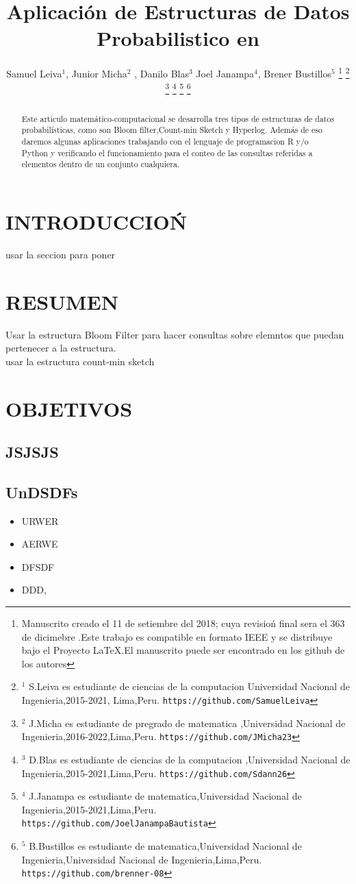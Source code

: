 \documentclass[journal]{IEEEtran}
\title{\LARGE \bf Aplicaci\'on de Estructuras de Datos Probabilistico en
}
\author{Samuel Leiva$^{1}$, Junior Micha$^{2}$ , Danilo Blas$^{3}$ Joel Janampa$^{4}$, Brener Bustillos$^{5}$%
\thanks{Manuscrito creado el 11 de setiembre del 2018; cuya revisio\'n final sera el 363 de dicimebre .Este trabajo es compatible en formato IEEE y se distribuye bajo el Proyecto LaTeX.El manuscrito puede ser encontrado en los github de los autores}%
\thanks{$^{1}$ S.Leiva es estudiante de ciencias de la computacion 
        Universidad Nacional de Ingenieria,2015-2021, Lima,Peru.
        {\tt\small https://github.com/SamuelLeiva}}%
\thanks{$^{2}$ J.Micha es estudiante de pregrado de matematica ,Universidad Nacional de Ingenieria,2016-2022,Lima,Peru.
        {\tt\small https://github.com/JMicha23}}%
\thanks{$^{3}$ D.Blas es estudiante de ciencias de la computacion ,Universidad Nacional de Ingenieria,2015-2021,Lima,Peru.
        {\tt\small https://github.com/Sdann26}}%
\thanks{$^{4}$ J.Janampa es estudiante de matematica,Universidad Nacional de Ingenieria,2015-2021,Lima,Peru.
        {\tt\small https://github.com/JoelJanampaBautista}}%
\thanks{$^{5}$ B.Bustillos es estudiante de matematica,Universidad Nacional de Ingenieria,Universidad Nacional de Ingenieria,Lima,Peru. 
        {\tt\small https://github.com/brenner-08}}%
}
\begin{document}
\maketitle
\thispagestyle{empty}
\pagestyle{empty}


\begin{abstract}
    

Este articulo matemático-computacional se desarrolla tres tipos de estructuras de datos probabilísticas, como son Bloom ﬁlter,Count-min Sketch y Hyperlog. Además de eso daremos algunas aplicaciones trabajando con el lenguaje de programacion R y/o Python y verificando el funcionamiento para el conteo de las consultas referidas a elementos dentro de un conjunto cualquiera.

\end{abstract}


\section{INTRODUCCIO\'N}

usar la seccion para poner 

\section{RESUMEN}
Usar la estructura Bloom Filter para hacer consultas sobre elemntos que puedan pertenecer a la estructura.\\
usar la estructura count-min sketch 

\section{OBJETIVOS}


\subsection{JSJSJS}

\subsection{UnDSDFs}

\begin{itemize}

\item URWER 
\item AERWE
\item DFSDF
\item DDD, 

\end{itemize}
\end{document}
